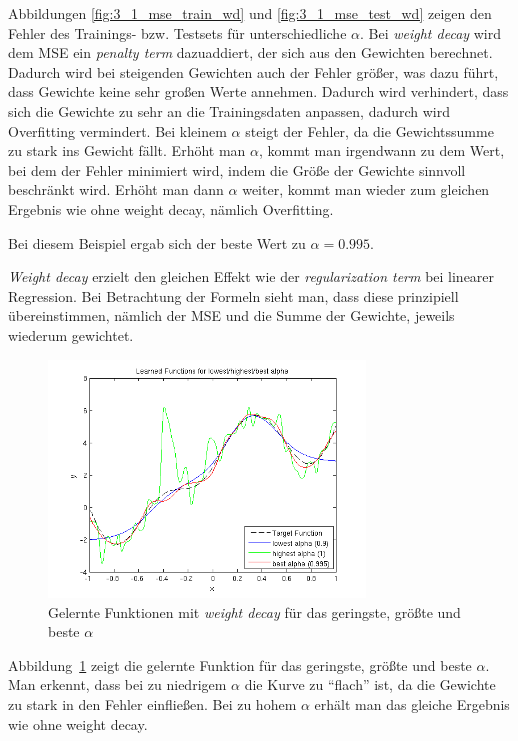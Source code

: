 Abbildungen \ref{fig:3_1_mse_train_wd} und \ref{fig:3_1_mse_test_wd} zeigen den Fehler des Trainings- bzw. Testsets für unterschiedliche $\alpha$. Bei \emph{weight decay} wird dem MSE ein \emph{penalty term} dazuaddiert, der sich aus den Gewichten berechnet. Dadurch wird bei steigenden Gewichten auch der Fehler größer, was dazu führt, dass Gewichte keine sehr großen Werte annehmen. Dadurch wird verhindert, dass sich die Gewichte zu sehr an die Trainingsdaten anpassen, dadurch wird Overfitting vermindert. Bei kleinem $\alpha$ steigt der Fehler, da die Gewichtssumme zu stark ins Gewicht fällt. Erhöht man $\alpha$, kommt man irgendwann zu dem Wert, bei dem der Fehler minimiert wird, indem die Größe der Gewichte sinnvoll beschränkt wird. Erhöht man dann $\alpha$ weiter, kommt man wieder zum gleichen Ergebnis wie ohne weight decay, nämlich Overfitting.

Bei diesem Beispiel ergab sich der beste Wert zu $\alpha = 0.995$.

\emph{Weight decay} erzielt den gleichen Effekt wie der \emph{regularization term} bei linearer Regression. Bei Betrachtung der Formeln sieht man, dass diese prinzipiell übereinstimmen, nämlich der MSE und die Summe der Gewichte, jeweils wiederum gewichtet.

\begin{figure}[h!]
  \centering
  \includegraphics[width=0.75\textwidth]{./figures/3/3_1_learned_wd.png}
  \caption{Gelernte Funktionen mit \emph{weight decay} für das geringste, größte und beste $\alpha$}
  \label{fig:3_1_learned_wd}
\end{figure}

Abbildung~\ref{fig:3_1_learned_wd} zeigt die gelernte Funktion für das geringste, größte und beste $\alpha$. Man erkennt, dass bei zu niedrigem $\alpha$ die Kurve zu ``flach'' ist, da die Gewichte zu stark in den Fehler einfließen. Bei zu hohem $\alpha$ erhält man das gleiche Ergebnis wie ohne weight decay.


